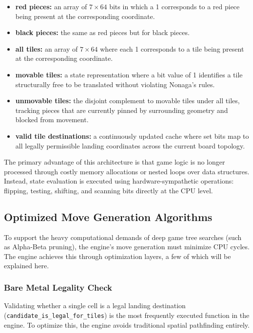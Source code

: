 \begin{itemize}
  \item \textbf{red pieces:} an array of $7 \times 64$ bits in which a 1 corresponds to a red piece being present at the corresponding coordinate.
  \item \textbf{black pieces:} the same as red pieces but for black pieces.
  \item \textbf{all tiles:} an array of $7 \times 64$ where each 1 corresponds to a tile being present at the corresponding coordinate.
  \item \textbf{movable tiles:} a state representation where a bit value of 1 identifies a tile structurally free to be translated without violating Nonaga's rules.
  \item \textbf{unmovable tiles:} the disjoint complement to movable tiles under all tiles, tracking pieces that are currently pinned by surrounding geometry and blocked from movement.
  \item \textbf{valid tile destinations:} a continuously updated cache where set bits map to all legally permissible landing coordinates across the current board topology.
\end{itemize}

The primary advantage of this architecture is that game logic is no longer processed through costly memory allocations or nested loops over data structures. Instead, state evaluation is executed using hardware-sympathetic operations: flipping, testing, shifting, and scanning bits directly at the CPU level.


\subsection{Optimized Move Generation Algorithms}
To support the heavy computational demands of deep game tree searches (such as Alpha-Beta pruning), the engine's move generation must minimize CPU cycles. The engine achieves this through optimization layers, a few of which will be explained here.

\subsubsection{Bare Metal Legality Check}\label{O1 lookup}
Validating whether a single cell is a legal landing destination (\texttt{candidate\_is\_legal\_for\_tiles}) is the most frequently executed function in the engine. To optimize this, the engine avoids traditional spatial pathfinding entirely.

